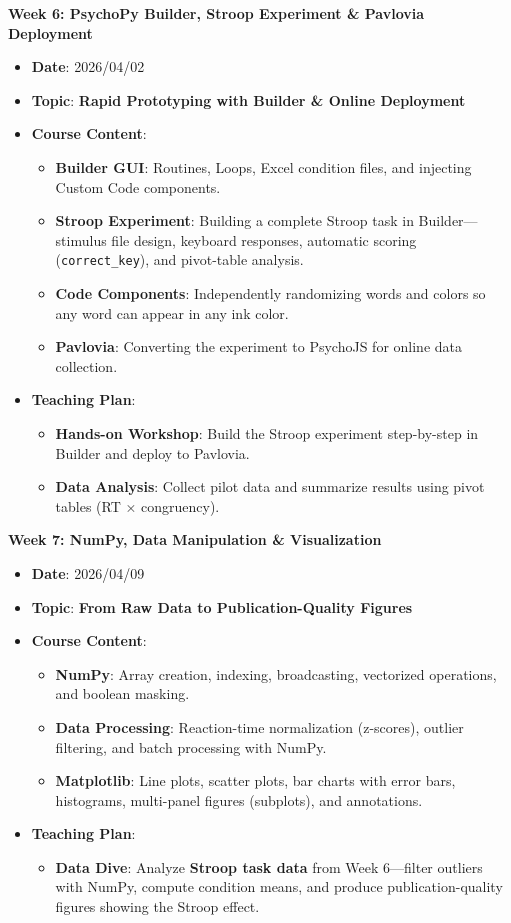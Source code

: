 \noindent\textbf{Week 6: PsychoPy Builder, Stroop Experiment \& Pavlovia Deployment}
\begin{itemize}
    \item \textbf{Date}: 2026/04/02
    \item \textbf{Topic}: \textbf{Rapid Prototyping with Builder \& Online Deployment}
    \item \textbf{Course Content}:
    \begin{itemize}
        \item \textbf{Builder GUI}: Routines, Loops, Excel condition files, and injecting Custom Code components.
        \item \textbf{Stroop Experiment}: Building a complete Stroop task in Builder—stimulus file design, keyboard responses, automatic scoring (\texttt{correct\_key}), and pivot-table analysis.
        \item \textbf{Code Components}: Independently randomizing words and colors so any word can appear in any ink color.
        \item \textbf{Pavlovia}: Converting the experiment to PsychoJS for online data collection.
    \end{itemize}
    \item \textbf{Teaching Plan}:
    \begin{itemize}
        \item \textbf{Hands-on Workshop}: Build the Stroop experiment step-by-step in Builder and deploy to Pavlovia.
        \item \textbf{Data Analysis}: Collect pilot data and summarize results using pivot tables (RT × congruency).
    \end{itemize}
\end{itemize}

\noindent\textbf{Week 7: NumPy, Data Manipulation \& Visualization}
\begin{itemize}
    \item \textbf{Date}: 2026/04/09
    \item \textbf{Topic}: \textbf{From Raw Data to Publication-Quality Figures}
    \item \textbf{Course Content}:
    \begin{itemize}
        \item \textbf{NumPy}: Array creation, indexing, broadcasting, vectorized operations, and boolean masking.
        \item \textbf{Data Processing}: Reaction-time normalization (z-scores), outlier filtering, and batch processing with NumPy.
        \item \textbf{Matplotlib}: Line plots, scatter plots, bar charts with error bars, histograms, multi-panel figures (subplots), and annotations.
    \end{itemize}
    \item \textbf{Teaching Plan}:
    \begin{itemize}
        \item \textbf{Data Dive}: Analyze \textbf{Stroop task data} from Week 6—filter outliers with NumPy, compute condition means, and produce publication-quality figures showing the Stroop effect.
    \end{itemize}
\end{itemize}

